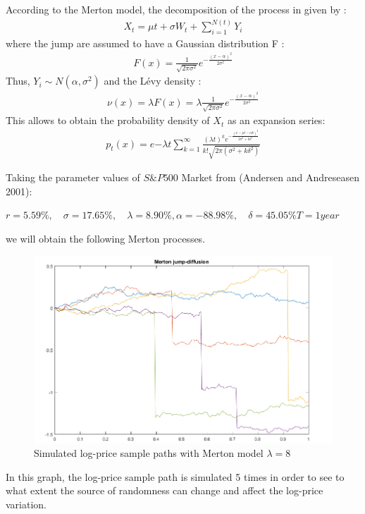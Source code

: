 \documentclass[12pt]{report}
\begin{document}
According to the Merton model, the decomposition of the process in given by :
\begin{gather}
X_t = \mu t+\sigma W_t+\sum_{i=1}^{N(t)} Y_i
\label{baz}
\end{gather}
where the jump  are assumed to have a Gaussian distribution F :
\begin{gather}
F(x) = \frac{1}{\sqrt{2\pi\sigma^2} } e^{ -\frac{(x-\alpha)^2}{2\sigma^2} }
\end{gather}
Thus, $Y_i  \sim N(\alpha,\sigma^2)$ and the Lévy density :
\begin{gather}
 \nu(x)=\lambda F(x)=\lambda\frac{1}{\sqrt{2\pi\sigma^2} } e^{ -\frac{(x-\alpha)^2}{2\sigma^2} }
\end{gather}
This allows to obtain the probability density of $X_t$ as an expansion series: 
\begin{gather}
p_t(x)=e{-\lambda t} \sum_{k=1}^{\infty} \frac{(\lambda t)^k  e^{ -\frac{(x-\mu t-\alpha k)^2}{2\sigma^2+k \delta^2}}}{k!  \sqrt{2\pi(\sigma^2+k \delta^2)}}
\end{gather}

Taking the parameter values of $S\&P500$ Market from (Andersen and Andreseasen 2001):

$ r =5.59 \%,\quad \sigma=17.65\%,\quad  \lambda=8.90\%, \alpha=-88.98\%,\quad  \delta=45.05\%  T=1 year $

we will obtain the following Merton processes. \\


\begin{figure}[h]

\centering
\includegraphics[scale=0.7]{merton.png} 
\caption{Simulated log-price sample paths with Merton model  $\lambda=8$}
\end{figure}
In this graph, the log-price sample path is simulated 5 times in order to see to what extent the source of randomness can change and affect the log-price variation. 
\\
\end{document}
